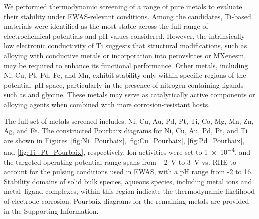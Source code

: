 \documentclass[journal=jacsat,manuscript=article]{achemso}
\begin{document}

We performed thermodynamic screening of a range of pure metals to evaluate their stability under EWAS-relevant conditions. Among the candidates, Ti-based materials were identified as the most stable across the full range of electrochemical potentials and pH values considered. However, the intrinsically low electronic conductivity of Ti suggests that structural modifications, such as alloying with conductive metals or incorporation into perovskites or MXenesm, may be required to enhance its functional performance. Other metals, including Ni, Cu, Pt, Pd, Fe, and Mn, exhibit stability only within specific regions of the potential–pH space, particularly in the presence of nitrogen-containing ligands such as  and glycine. These metals may serve as catalytically active components or alloying agents when combined with more corrosion-resistant hosts. 

The full set of metals screened includes: Ni, Cu, Au, Pd, Pt, Ti, Co, Mg, Mn, Zn, Ag, and Fe. The constructed Pourbaix diagrams for Ni, Cu, Au, Pd, Pt, and Ti are shown in Figures~\ref{fig:Ni_Pourbaix}, \ref{fig:Cu_Pourbaix}, \ref{fig:Pd_Pourbaix}, and \ref{fig:Ti_Pt_Pourbaix}, respectively. Ion activities were set to \SI{1e-4}{\molar}, and the targeted operating potential range spans from \SI{-2}{V} to \SI{3}{V} vs. RHE to account for the pulsing conditions used in EWAS, with a pH range from -2 to 16. Stability domains of solid bulk species, aqueous species, including metal ions and metal–ligand complexes, within this region indicate the thermodynamic likelihood of electrode corrosion. Pourbaix diagrams for the remaining metals are provided in the Supporting Information.
\end{document}
